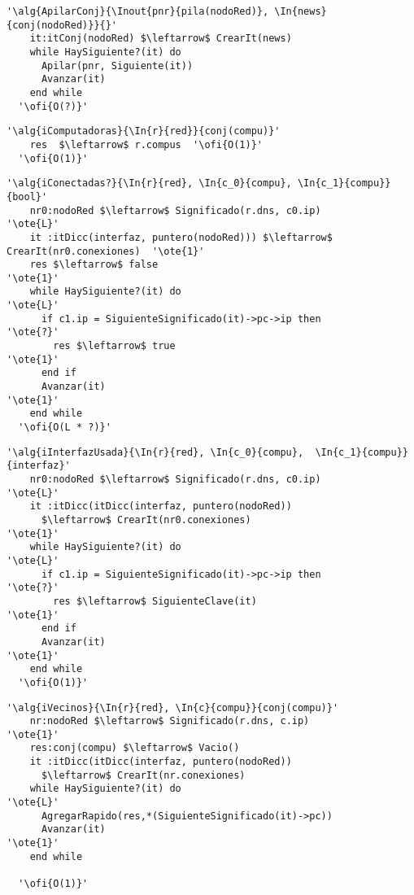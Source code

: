 \begin{lstlisting}[mathescape]
  '\alg{ApilarConj}{\Inout{pnr}{pila(nodoRed)}, \In{news}{conj(nodoRed)}}{}'
    it:itConj(nodoRed) $\leftarrow$ CrearIt(news)
    while HaySiguiente?(it) do                                                     
      Apilar(pnr, Siguiente(it))
      Avanzar(it)
    end while
  '\ofi{O(?)}'
\end{lstlisting}


\begin{lstlisting}[mathescape]
  '\alg{iComputadoras}{\In{r}{red}}{conj(compu)}'
    res  $\leftarrow$ r.compus  '\ofi{O(1)}'
  '\ofi{O(1)}'
\end{lstlisting}

\begin{lstlisting}[mathescape]
  '\alg{iConectadas?}{\In{r}{red}, \In{c_0}{compu}, \In{c_1}{compu}}{bool}'
    nr0:nodoRed $\leftarrow$ Significado(r.dns, c0.ip)                   '\ote{L}' 
    it :itDicc(interfaz, puntero(nodoRed))) $\leftarrow$ CrearIt(nr0.conexiones)  '\ote{1}' 
    res $\leftarrow$ false                                                         '\ote{1}'
    while HaySiguiente?(it) do                                                     '\ote{L}'
      if c1.ip = SiguienteSignificado(it)->pc->ip then                              '\ote{?}'
        res $\leftarrow$ true                                                      '\ote{1}'
      end if
      Avanzar(it)                                                                  '\ote{1}'
    end while
  '\ofi{O(L * ?)}'
\end{lstlisting}

\begin{lstlisting}[mathescape]
  '\alg{iInterfazUsada}{\In{r}{red}, \In{c_0}{compu},  \In{c_1}{compu}}{interfaz}'
    nr0:nodoRed $\leftarrow$ Significado(r.dns, c0.ip)                   '\ote{L}' 
    it :itDicc(itDicc(interfaz, puntero(nodoRed)) 
      $\leftarrow$ CrearIt(nr0.conexiones)                                        '\ote{1}' 
    while HaySiguiente?(it) do                                                     '\ote{L}'
      if c1.ip = SiguienteSignificado(it)->pc->ip then                             '\ote{?}'
        res $\leftarrow$ SiguienteClave(it)                                        '\ote{1}'
      end if
      Avanzar(it)                                                                  '\ote{1}'
    end while
  '\ofi{O(1)}'
\end{lstlisting}


\begin{lstlisting}[mathescape]
  '\alg{iVecinos}{\In{r}{red}, \In{c}{compu}}{conj(compu)}'
    nr:nodoRed $\leftarrow$ Significado(r.dns, c.ip)                     '\ote{1}'
    res:conj(compu) $\leftarrow$ Vacio()
    it :itDicc(itDicc(interfaz, puntero(nodoRed)) 
      $\leftarrow$ CrearIt(nr.conexiones)        
    while HaySiguiente?(it) do                                                     '\ote{L}'
      AgregarRapido(res,*(SiguienteSignificado(it)->pc))
      Avanzar(it)                                                                  '\ote{1}'
    end while

  '\ofi{O(1)}'
\end{lstlisting}

